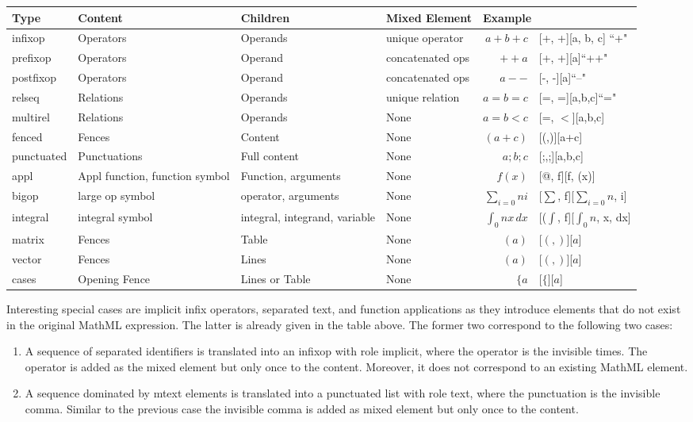\documentclass{article}
\begin{document}
\noindent
\begin{tabular}{l||p{3.5cm}|p{3.5cm}|l||r@{$\quad\longrightarrow\quad$}l}
  Type & Content & Children & Mixed Element & \multicolumn{2}{l}{Example}\\\hline
  infixop & Operators & Operands & unique operator & $a+b+c$ &  [+, +][a, b, c] ``+" \\
  prefixop & Operators & Operand & concatenated ops & $++a$ & [+, +][a]``++" \\ 
  postfixop & Operators & Operand & concatenated ops & $a--$ & [-, -][a]``--" \\ 
  relseq & Relations & Operands & unique relation & $a=b=c$ & [=, =][a,b,c]``=" \\ 
  multirel & Relations & Operands & None & $a=b<c$ & [=, $<$][a,b,c] \\ 
  fenced & Fences & Content & None & $(a + c)$ & [(,)][a+c]\\
  punctuated & Punctuations & Full content & None & $a;b;c$ & [;,;][a,b,c]\\
  appl & Appl function, function symbol & Function, arguments & None & $f(x)$ & [@, f][f, (x)]\\ 
  bigop & large op symbol & operator, arguments & None & $\sum_{i=0}{n} i$ & [$\sum$, f][$\sum_{i=0}{n}$, i]\\ 
  integral & integral symbol & integral, integrand, variable & None & $\int_{0}{n}x\, dx$ & [($\int$, f][$\int_{0}{n}$, x, dx]\\
  matrix & Fences & Table & None & $(a)$ & [$(,)$][$a$]\\
  vector & Fences & Lines & None & $(a)$ & [$(,)$][$a$]\\
  cases & Opening Fence & Lines or Table & None & $\{a$ & [$\{$][$a$]\\
\end{tabular}


Interesting special cases are implicit infix operators, separated text, and
function applications as they introduce elements that do not exist in the
original MathML expression. The latter is already given in the table above. The
former two correspond to the following two cases:

\begin{enumerate}
\item A sequence of separated identifiers is translated into an infixop with
  role implicit, where the operator is the invisible times. The operator is
  added as the mixed element but only once to the content. Moreover, it does not
  correspond to an existing MathML element.
\item A sequence dominated by mtext elements is translated into a punctuated
  list with role text, where the punctuation is the invisible comma. Similar to
  the previous case the invisible comma is added as mixed element but only once
  to the content.
\end{enumerate}
\end{document}
